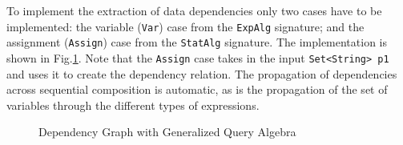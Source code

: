 To implement the extraction of data dependencies only two cases have to
be implemented: the variable (\lstinline{Var}) case from the
\lstinline{ExpAlg} signature; and the assignment (\lstinline{Assign})
case from the \lstinline{StatAlg} signature.  The implementation is
shown in Fig.\ref{deps2}.  Note that the \lstinline{Assign} case takes
in the input \lstinline{Set<String> p1} and uses it to create the
dependency relation.  The propagation of dependencies across
sequential composition is automatic, as is the propagation of the set
of variables through the different types of expressions.


\begin{figure}[t]
\vspace{-.1in}
\caption{Dependency Graph with Generalized Query Algebra}
\label{deps2}
\end{figure}

\begin{comment}
\haoyuan{Begin: client code.}



\haoyuan{End: client code.}
\end{comment}

